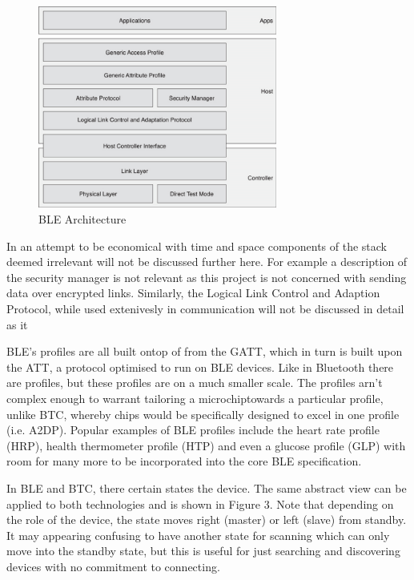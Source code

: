 \documentclass[]{article}
\begin{document}
\begin{figure}[htb]
	\begin{center}
		\includegraphics[width = 0.7\textwidth]{ble_arch}
	\end{center}
	\caption{\ac{BLE} Architecture}
	\label{fig:ble_arch}
\end{figure}

In an attempt to be economical with time and space components of the stack deemed irrelevant will not be discussed further here. For example a description of the security manager is not relevant as this project is not concerned with sending data over encrypted links. Similarly, the Logical Link Control and Adaption Protocol, while used extenivesly in communication will not be discussed in detail as it 

\ac{BLE}'s profiles are all built ontop of from the \ac{GATT}, which in turn is built upon the \ac{ATT}, a protocol optimised to run on BLE devices. Like in Bluetooth there are profiles, but these profiles are on a much smaller scale. The profiles arn't complex enough to warrant tailoring a microchiptowards a particular profile, unlike \ac{BTC}, whereby chips would be specifically designed to excel in one profile (i.e. A2DP). Popular examples of \ac{BLE} profiles include the heart rate profile (HRP), health thermometer profile (HTP) and even a glucose profile (GLP) with room for many more to be incorporated into the core \ac{BLE} specification. 

In BLE and BTC, there certain states the device. The same abstract view can be applied to both technologies and is shown in Figure 3. Note that depending on the role of the device, the state moves right (master) or left (slave) from standby. It may appearing confusing to have another state for scanning which can only move into the standby state, but this is useful for just searching and discovering devices with no commitment to connecting. 
\end{document}
